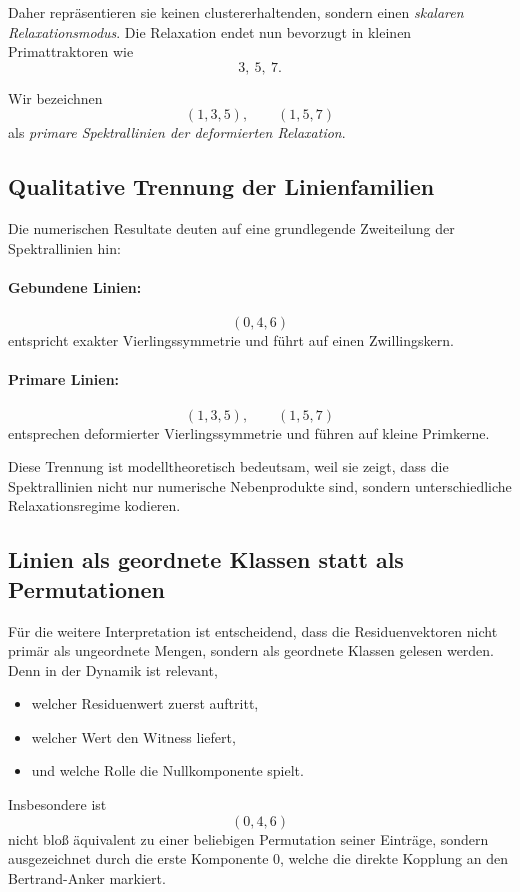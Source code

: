 \documentclass[11pt,a4paper]{article}
\theoremstyle{definition}
\theoremstyle{plain}
\theoremstyle{remark}
\begin{document}
	Daher repräsentieren sie keinen clustererhaltenden, sondern einen \emph{skalaren Relaxationsmodus}. 
	Die Relaxation endet nun bevorzugt in kleinen Primattraktoren wie
	\[
	3,\ 5,\ 7.
	\]
	
	Wir bezeichnen
	\[
	(1,3,5),\qquad (1,5,7)
	\]
	als \emph{primare Spektrallinien der deformierten Relaxation}.
	
	\subsection{Qualitative Trennung der Linienfamilien}
	
	Die numerischen Resultate deuten auf eine grundlegende Zweiteilung der Spektrallinien hin:
	
	\paragraph{Gebundene Linien:}
	\[
	(0,4,6)
	\]
	entspricht exakter Vierlingssymmetrie und führt auf einen Zwillingskern.
	
	\paragraph{Primare Linien:}
	\[
	(1,3,5),\qquad (1,5,7)
	\]
	entsprechen deformierter Vierlingssymmetrie und führen auf kleine Primkerne.
	
	Diese Trennung ist modelltheoretisch bedeutsam, weil sie zeigt, dass die Spektrallinien nicht nur numerische Nebenprodukte sind, sondern unterschiedliche Relaxationsregime kodieren.
	
	\subsection{Linien als geordnete Klassen statt als Permutationen}
	
	Für die weitere Interpretation ist entscheidend, dass die Residuenvektoren nicht primär als ungeordnete Mengen, sondern als geordnete Klassen gelesen werden. 
	Denn in der Dynamik ist relevant,
	
	\begin{itemize}
		\item welcher Residuenwert zuerst auftritt,
		\item welcher Wert den Witness liefert,
		\item und welche Rolle die Nullkomponente spielt.
	\end{itemize}
	
	Insbesondere ist
	\[
	(0,4,6)
	\]
	nicht bloß äquivalent zu einer beliebigen Permutation seiner Einträge, sondern ausgezeichnet durch die erste Komponente \(0\), welche die direkte Kopplung an den Bertrand-Anker markiert.
	
\end{document}
